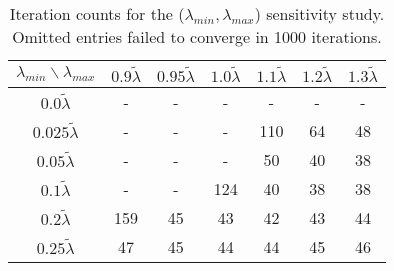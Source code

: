 \def\tlam {{\tilde \lambda}}
\begin{table}
\small
\centering
\begin{tabular}{||c|c c c c c c||}
  \hline
  $\lambda_{min}\backslash \lambda_{max}$ & \rule{0pt}{2.5ex}
$0.9 \tlam$ & $0.95 \tlam$ & $1.0 \tlam$ & $1.1 \tlam$ & $1.2 \tlam$ & $1.3 \tlam$\\ 
\hline\hline \rule{0pt}{2.5ex}
$0.0   \tlam$ & - & - & - & - & - & - \\
$0.025 \tlam$ & - & - & - & 110  & 64   & 48 \\
$0.05  \tlam$ & - & - & - & 50   & 40   & 38 \\
$0.1   \tlam$ & - & - & 124  & 40   & 38   & 38 \\
$0.2   \tlam$ & 159  & 45   & 43   & 42   & 43   & 44 \\
$0.25  \tlam$ & 47   & 45   & 44   & 44   & 45   & 46 \\
\hline
\end{tabular}
\captionsetup{labelformat=empty}
\caption{\small
Iteration counts for the ($\lambda_{min},\lambda_{max}$) sensitivity study.
Omitted entries failed to converge in 1000 iterations.
\label{table:kershaw-eig-multiplier-0.3}}
\end{table}
